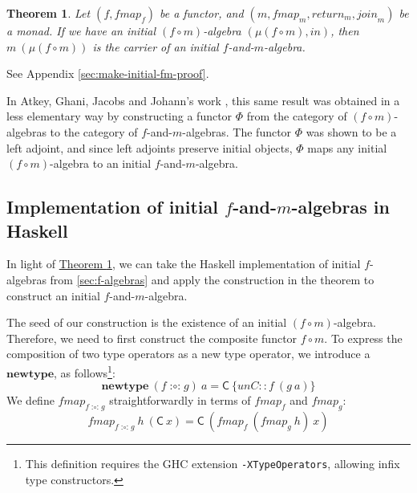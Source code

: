 \documentclass{jfp1}
\newcommand{\pattynote}[1]{\todo[inline, color=green!40]{#1}}
\newtheorem{theorem}{Theorem}
\newcommand{\thmref}[1]{\hyperref[#1]{Theorem \ref*{#1}}}
\newcommand{\appendixref}[1]{Appendix \ref*{#1}}
\newcommand{\kw}[1]{\textbf{#1}}
\begin{document}
\begin{theorem}\label{thm:make-initial-f-and-m-alg}
  Let $(f, \mathit{fmap}_f)$ be a functor, and $(m, \mathit{fmap}_m,
  \mathit{return}_m, \mathit{join}_m)$ be a monad.  If we have an
  initial $(f \circ m)$-algebra $(\mu(f \circ m),
  \mathit{in})$, then $m~(\mu(f \circ m))$ is the carrier of an
  initial $f$-and-$m$-algebra.
\end{theorem}

\begin{proof*}
  See \appendixref{sec:make-initial-fm-proof}.
\end{proof*}

In Atkey, Ghani, Jacobs and Johann's work \cite{atkey12fibrational},
this same result was obtained in a less elementary way by constructing
a functor $\Phi$ from the category of $(f \circ m)$-algebras to the
category of $f$-and-$m$-algebras. The functor $\Phi$ was shown to be a
left adjoint, and since left adjoints preserve initial objects, $\Phi$
maps any initial $(f \circ m)$-algebra to an initial
$f$-and-$m$-algebra.


\subsection{Implementation of initial \texorpdfstring{$f$}{f}-and-\texorpdfstring{$m$}{m}-algebras in Haskell}
\label{sec:f-and-m-alg-impl}

\newcommand{\fcompose}{\mathop{\mathord:\circ\mathord:}}

In light of \thmref{thm:make-initial-f-and-m-alg}, we can take the
Haskell implementation of initial $f$-algebras from
\autoref{sec:f-algebras} and apply the construction in the theorem to
construct an initial $f$-and-$m$-algebra.

The seed of our construction is the existence of an initial $(f \circ
m)$-algebra. Therefore, we need to first construct the composite
functor $f \circ m$. To express the composition of two type operators
as a new type operator, we introduce a $\kw{newtype}$, as
follows\footnote{This definition requires the GHC extension
  \texttt{-XTypeOperators}, allowing infix type constructors.}:
\begin{displaymath}
  \kw{newtype}~(f \fcompose g)~a = \mathsf{C}~\{\mathit{unC} :: f~(g~a) \}
\end{displaymath}
We define $\mathit{fmap}_{f\fcompose g}$ straightforwardly in terms of
$\mathit{fmap}_f$ and $\mathit{fmap}_g$:
\begin{displaymath}
  \mathit{fmap}_{f\fcompose g}~h~(\mathsf{C}~x) = \mathsf{C}~(\mathit{fmap}_f~(\mathit{fmap}_g~h)~x)
\end{displaymath}
\end{document}
